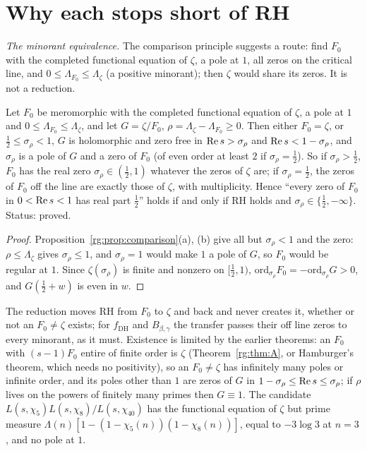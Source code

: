 \section{Why each stops short of RH}\label{rg:sec:stop}

\emph{The minorant equivalence.} The comparison principle suggests a route: find $F_0$ with the completed functional equation of $\zeta$, a pole at $1$, all zeros on the critical line, and $0\le\Lambda_{F_0}\le\Lambda_\zeta$ (a positive minorant); then $\zeta$ would share its zeros. It is not a reduction.

\begin{theorem}\label{rg:thm:minorant}
Let $F_0$ be meromorphic with the completed functional equation of $\zeta$, a pole at $1$ and $0\le\Lambda_{F_0}\le\Lambda_\zeta$, and let $G=\zeta/F_0$, $\rho=\Lambda_\zeta-\Lambda_{F_0}\ge0$. Then either $F_0=\zeta$, or $\frac12\le\sigma_\rho<1$, $G$ is holomorphic and zero free in $\operatorname{Re} s>\sigma_\rho$ and $\operatorname{Re} s<1-\sigma_\rho$, and $\sigma_\rho$ is a pole of $G$ and a zero of $F_0$ (of even order at least $2$ if $\sigma_\rho=\frac12$). So if $\sigma_\rho>\frac12$, $F_0$ has the real zero $\sigma_\rho\in(\frac12,1)$ whatever the zeros of $\zeta$ are; if $\sigma_\rho=\frac12$, the zeros of $F_0$ off the line are exactly those of $\zeta$, with multiplicity. Hence ``every zero of $F_0$ in $0<\operatorname{Re} s<1$ has real part $\frac12$'' holds if and only if RH holds and $\sigma_\rho\in\{\frac12,-\infty\}$. Status: proved.
\end{theorem}

\begin{proof}
Proposition~\ref{rg:prop:comparison}(a), (b) give all but $\sigma_\rho<1$ and the zero: $\rho\le\Lambda_\zeta$ gives $\sigma_\rho\le1$, and $\sigma_\rho=1$ would make $1$ a pole of $G$, so $F_0$ would be regular at $1$. Since $\zeta(\sigma_\rho)$ is finite and nonzero on $[\frac12,1)$, $\mathrm{ord}_{\sigma_\rho}F_0=-\mathrm{ord}_{\sigma_\rho}G>0$, and $G(\frac12+w)$ is even in $w$. \qedhere
\end{proof}

The reduction moves RH from $F_0$ to $\zeta$ and back and never creates it, whether or not an $F_0\ne\zeta$ exists; for $f_{\mathrm{DH}}$ and $B_{\beta,\gamma}$ the transfer passes their off line zeros to every minorant, as it must. Existence is limited by the earlier theorems: an $F_0$ with $(s-1)F_0$ entire of finite order is $\zeta$ (Theorem~\ref{rg:thm:A}, or Hamburger's theorem, which needs no positivity), so an $F_0\ne\zeta$ has infinitely many poles or infinite order, and its poles other than $1$ are zeros of $G$ in $1-\sigma_\rho\le\operatorname{Re} s\le\sigma_\rho$; if $\rho$ lives on the powers of finitely many primes then $G\equiv1$. The candidate $L(s,\chi_5)L(s,\chi_8)/L(s,\chi_{40})$ has the functional equation of $\zeta$ but prime measure $\Lambda(n)[1-(1-\chi_5(n))(1-\chi_8(n))]$, equal to $-3\log3$ at $n=3$, and no pole at $1$.


